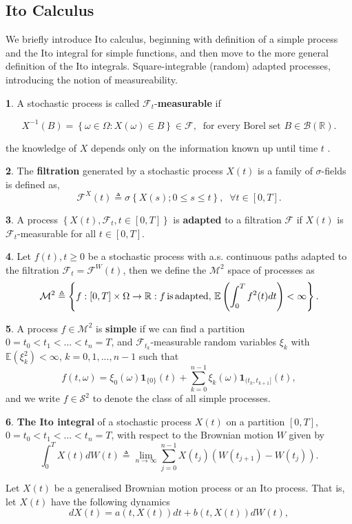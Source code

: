 \documentclass[british]{amsart} \usepackage{lmodern}
\numberwithin{equation}{section} \numberwithin{figure}{section}
\theoremstyle{plain} \newtheorem{thm}{\protect\theoremname}[section]
\theoremstyle{definition} \newtheorem{defn}[thm]{\protect\definitionname}
\theoremstyle{plain} \newtheorem{assumption}[thm]{\protect\assumptionname}
\theoremstyle{plain} \newtheorem{lem}[thm]{\protect\lemmaname}
\theoremstyle{plain} \newtheorem{prop}[thm]{\protect\propositionname}
\theoremstyle{remark} \newtheorem{rem}[thm]{\protect\remarkname}
\theoremstyle{plain} \newtheorem{cor}[thm]{\protect\corollaryname}
\begin{document}
\subsection{Ito Calculus}

We briefly introduce Ito calculus, beginning with definition of a
simple process and the Ito integral for simple functions, and
then move to the more general definition of the Ito integrals. Square-integrable
(random) adapted processes, introducing the notion of measureability. 
\begin{defn}
A stochastic process is called $\mathcal{F}_{t}$-\textbf{measurable}
if 

\[
X^{-1}(B)=\left\{ \omega\in\Omega:X(\omega)\in B\right\} \in\mathcal{F},\;\;\text{for every Borel set }B\in\mathcal{B}(\mathbb{R}).
\]

the knowledge of $X$ depends only on the information known up until
time $t$ .
\end{defn}
%
\begin{defn}
The \textbf{filtration} generated by a stochastic process $X(t)$
is a family of $\sigma$-fields is defined as, 
\[
\mathcal{F}^{X}(t)\triangleq\sigma\left\{ X(s);0\le s\le t\right\} ,\;\;\forall t\in[0,T].
\]
\end{defn}
%
\begin{defn}
A process $\left\{ X(t),\mathcal{F}_{t},t\in[0,T]\right\} $ is \textbf{adapted}
to a filtration $\mathcal{F}$ if $X(t)$ is $\mathcal{F}_{t}$-measurable
for all $t\in[0,T]$. 
\end{defn}
%
\begin{defn}
Let $f(t),t\ge0$ be a stochastic process with a.s. continuous paths
adapted to the filtration $\mathcal{F}_{t}=\mathcal{F}^{W}(t)$, then
we define the $\mathcal{M}^{2}$ space of processes as
\[
\mathcal{M}^{2}\triangleq\left\{ f:[0,T]\times\Omega\to\mathbb{R}:f\,\text{is\,adapted},\,\mathbb{E}\left(\int_{0}^{T}f^{2}(t)dt\right)<\infty\right\} .
\]
\end{defn}
%
\begin{defn}
A process $f\in\mathcal{M}^{2}$ is \textbf{simple} if we can find
a partition $0=t_{0}<t_{1}<...<t_{n}=T$, and $\mathcal{F}_{t_{k}}$-measurable
random variables $\xi_{k}$ with $\mathbb{E}(\xi_{k}^{2})<\infty$,
$k=0,1,...,n-1$ such that
\[
f(t,\omega)=\xi_{0}(\omega)\mathbf{1}_{\{0\}}(t)+\sum_{k=0}^{n-1}\xi_{k}(\omega)\mathbf{1}_{(t_{k},t_{k+1}]}(t),
\]
 and we write $f\in\mathcal{S}^{2}$ to denote the class of all simple
processes.
\end{defn}
%
\begin{defn}
\textbf{The Ito integral} of a stochastic process $X(t)$ on a partition
$[0,T]$, $0=t_{0}<t_{1}<\ldots<t_{n}=T$, with respect to the Brownian
motion $W$ given by
\[
\int_{0}^{T}X(t)dW(t)\triangleq\lim_{n\to\infty}\sum_{j=0}^{n-1}X(t_{j})\left(W(t_{j+1})-W(t_{j})\right).
\]
%
\end{defn}
Let $X(t)$ be a generalised Brownian motion process or an Ito process.
That is, let $X(t)$ have the following dynamics
%
\begin{equation}
dX(t)=a(t,X(t))dt+b(t,X(t))dW(t),
\end{equation}
\end{document}

